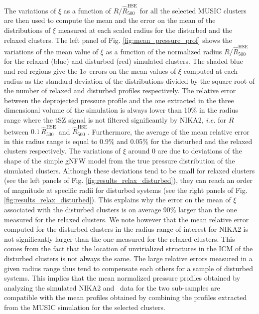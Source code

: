 \documentclass[twocolumn,traditabstract]{aa}
\begin{document}
The variations of $\xi$ as a function of $R/\hat{R}_{500}^{\mathrm{HSE}}$ for all the selected MUSIC clusters are then used to compute the mean and the error on the mean of the distributions of $\xi$ measured at each scaled radius for the disturbed and the relaxed clusters. The left panel of Fig. \ref{fig:mean_pressure_prof} shows the variations of the mean value of $\xi$ as a function of the normalized radius $R/\hat{R}_{500}^{\mathrm{HSE}}$ for the relaxed (blue) and disturbed (red) simulated clusters. The shaded blue and red regions give the $1\sigma$ errors on the mean values of $\xi$ computed at each radius as the standard deviation of the distributions divided by the square root of the number of relaxed and disturbed profiles respectively. The relative error between the deprojected pressure profile and the one extracted in the three dimensional volume of the simulation is always lower than 10\% in the radius range where the tSZ signal is not filtered significantly by NIKA2, \emph{i.e.} for $R$ between $0.1 \, \hat{R}_{500}^{\mathrm{HSE}}$ and $\hat{R}_{500}^{\mathrm{HSE}}$. Furthermore, the average of the mean relative error in this radius range is equal to 0.9\% and 0.05\% for the disturbed and the relaxed clusters respectively. The variations of $\xi$ around 0 are due to deviations of the shape of the simple gNFW model from the true pressure distribution of the simulated clusters. Although these deviations tend to be small for relaxed clusters (see the left panels of Fig. \ref{fig:results_relax_disturbed}), they can reach an order of magnitude at specific radii for disturbed systems (see the right panels of Fig. \ref{fig:results_relax_disturbed}). This explains why the error on the mean of $\xi$ associated with the disturbed clusters is on average 90\% larger than the one measured for the relaxed clusters. We note however that the mean relative error computed for the disturbed clusters in the radius range of interest for NIKA2 is not significantly larger than the one measured for the relaxed clusters. This comes from the fact that the location of unvirialized structures in the ICM of the disturbed clusters is not always the same. The large relative errors measured in a given radius range thus tend to compensate each others for a sample of disturbed systems. This implies that the mean normalized pressure profiles obtained by analyzing the simulated NIKA2 and \planck\ data for the two sub-samples are compatible with the mean profiles obtained by combining the profiles extracted from the MUSIC simulation for the selected clusters.\\
\end{document}
